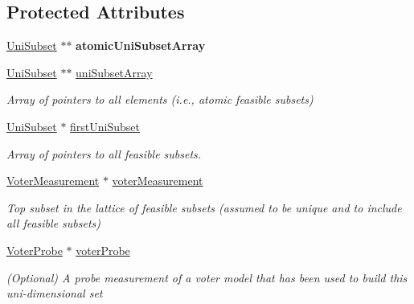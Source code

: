 \subsection*{Protected Attributes}
\begin{DoxyCompactItemize}
\item 
\hypertarget{classUniSet_a16746d02b5503c5d8c62fe4dff46c5b3}{\hyperlink{classUniSubset}{Uni\-Subset} $\ast$$\ast$ {\bfseries atomic\-Uni\-Subset\-Array}}\label{classUniSet_a16746d02b5503c5d8c62fe4dff46c5b3}

\item 
\hypertarget{classUniSet_a154ae422d9f248c8b50f39d575f9b3c0}{\hyperlink{classUniSubset}{Uni\-Subset} $\ast$$\ast$ \hyperlink{classUniSet_a154ae422d9f248c8b50f39d575f9b3c0}{uni\-Subset\-Array}}\label{classUniSet_a154ae422d9f248c8b50f39d575f9b3c0}

\begin{DoxyCompactList}\small\item\em Array of pointers to all elements (i.\-e., atomic feasible subsets) \end{DoxyCompactList}\item 
\hypertarget{classUniSet_a8b2ca464176feddcd8d96c75514eba6b}{\hyperlink{classUniSubset}{Uni\-Subset} $\ast$ \hyperlink{classUniSet_a8b2ca464176feddcd8d96c75514eba6b}{first\-Uni\-Subset}}\label{classUniSet_a8b2ca464176feddcd8d96c75514eba6b}

\begin{DoxyCompactList}\small\item\em Array of pointers to all feasible subsets. \end{DoxyCompactList}\item 
\hypertarget{classUniSet_a7c4bf064154e0a7baf8126b7fbe56d24}{\hyperlink{classVoterMeasurement}{Voter\-Measurement} $\ast$ \hyperlink{classUniSet_a7c4bf064154e0a7baf8126b7fbe56d24}{voter\-Measurement}}\label{classUniSet_a7c4bf064154e0a7baf8126b7fbe56d24}

\begin{DoxyCompactList}\small\item\em Top subset in the lattice of feasible subsets (assumed to be unique and to include all feasible subsets) \end{DoxyCompactList}\item 
\hypertarget{classUniSet_a3f7c0c9a9b7dd5a9607201cfa478d567}{\hyperlink{classVoterProbe}{Voter\-Probe} $\ast$ \hyperlink{classUniSet_a3f7c0c9a9b7dd5a9607201cfa478d567}{voter\-Probe}}\label{classUniSet_a3f7c0c9a9b7dd5a9607201cfa478d567}

\begin{DoxyCompactList}\small\item\em (Optional) A probe measurement of a voter model that has been used to build this uni-\/dimensional set \end{DoxyCompactList}\end{DoxyCompactItemize}


